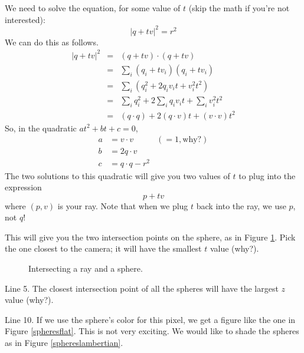 \documentclass{article}
\newcommand{\mydot}[1]{\draw[fill] (#1) circle (0.1);}
\begin{document}
\begin{description}
\begin{description}
We need to solve the equation, for some value of $t$
(skip the math if you're not interested):
\[
|{q} + tv|^2 = r^2
\]
We can do this as follows.
\begin{eqnarray*}
|{q}+tv|^2 &=& ({q}+tv)\cdot({q}+tv)\\
&=& \sum_i ({q}_i + tv_i)({q}_i + tv_i)\\
&=& \sum_i \left({q}_i^2 + 2{q}_iv_it + v_i^2t^2\right)\\
&=& \sum_i {q}_i^2 + 2\sum_i{q}_iv_it + \sum_iv_i^2t^2\\
&=& ({q}\cdot {q}) + 2({q}\cdot v) t+ (v\cdot v) t^2
\end{eqnarray*}
So, in the quadratic $at^2 + bt + c = 0$,
\begin{align*}
a &= v\cdot v  & (= 1, \mbox{why?})\\
b &= 2{q}\cdot v\\
c &= {q}\cdot {q} - r^2
\end{align*}
The two solutions to this quadratic will give you two values of $t$ to
plug into the expression
\[
p + tv
\]
where $(p,v)$ is your ray.   Note that when we
plug $t$ back into the ray, we use $p$, not ${q}$!

This will give you the two intersection
points on the sphere, as in Figure \ref{intersectingraysphere}.  Pick
the one closest to the camera; it will have the smallest $t$ value
(why?).

\begin{figure}

    \begin{center}
\end{center}    

    \caption{Intersecting a ray and a sphere.}
    \label{intersectingraysphere}
\end{figure}


\item Line 5.  The closest intersection point of all the spheres
  will have the largest
  $z$ value (why?).

\item Line 10.
 If we use the
sphere's color for this pixel, we get a figure like the one in Figure
\ref{spheresflat}.  This is not very exciting.  We would like to shade
the spheres as in Figure \ref{sphereslambertian}.


\end{description}
\end{description}
\end{document}
